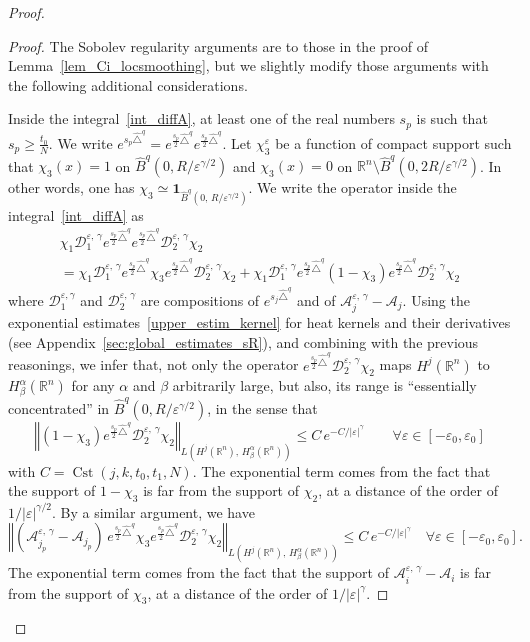 \documentclass[10pt]{amsart}
\theoremstyle{definition}\newtheorem{defi}[theo]{Definition}\newtheorem{rema}[theo]{Remark}\newtheorem{exam}[theo]{Example}\newtheorem{exem}[theo]{Example}\newtheorem{nota}[theo]{Notation}
\newcommand*\R{\mathbb{R}}
\newcommand{\calA}{\mathcal{A}}
\newcommand{\calD}{\mathcal{D}}
\newcommand{\bfun}{\mathbf{1}}
\DeclareMathOperator{\Cst}{Cst}
\renewcommand{\geq}{\geqslant}
\renewcommand{\leq}{\leqslant}
\let\oldforall\forall
\renewcommand*{\forall}{\mathrel{\oldforall}}
\begin{document}
\begin{proof}
\begin{proof}
The Sobolev regularity arguments are to those in the proof of Lemma~\ref{lem_Ci_locsmoothing}, but we slightly modify those arguments with the following additional considerations.

Inside the integral~\eqref{int_diffA}, at least one of the real numbers $s_p$ is such that $s_p\geq \frac{t_0}{N}$. We write $e^{s_p \widehat{\triangle}^{q}}=e^{\frac{s_p}{2} \widehat{\triangle}^{q}} e^{\frac{s_p}{2} \widehat{\triangle}^{q}}$. Let $\chi_3^\varepsilon$ be a function of compact support such that $\chi_3(x)=1$ on $\widehat{B}^q(0,R/\varepsilon^{\gamma/2})$ and $\chi_3(x)=0$ on $\R^n\setminus\widehat{B}^q(0,2R/\varepsilon^{\gamma/2})$. In other words, one has $\chi_3\simeq\bfun_{\widehat{B}^q(0,\,R/\varepsilon^{\gamma/2})}$. We write the operator inside the integral~\eqref{int_diffA} as
\begin{multline*}
\chi_1\calD_1^{\varepsilon,\,\gamma} e^{\frac{s_p}{2} \widehat{\triangle}^{q}} e^{\frac{s_p}{2} \widehat{\triangle}^{q}} \calD_2^{\varepsilon,\,\gamma} \chi_2\\
=
\chi_1\calD_1^{\varepsilon,\,\gamma} e^{\frac{s_p}{2} \widehat{\triangle}^{q}} \chi_3 e^{\frac{s_p}{2} \widehat{\triangle}^{q}} \calD_2^{\varepsilon,\,\gamma} \chi_2 
+
\chi_1\calD_1^{\varepsilon,\,\gamma} e^{\frac{s_p}{2} \widehat{\triangle}^{q}} (1-\chi_3) e^{\frac{s_p}{2} \widehat{\triangle}^{q}} \calD_2^{\varepsilon,\,\gamma} \chi_2
\end{multline*}
where $\calD_1^{\varepsilon,\gamma}$ and $\calD_2^{\varepsilon,\,\gamma}$ are compositions of $e^{s_j \widehat{\triangle}^{q}}$ and of $\calA_{j}^{\varepsilon,\,\gamma} - \calA_{j}$. Using the exponential estimates~\eqref{upper_estim_kernel} for heat kernels and their derivatives (see Appendix~\ref{sec:global_estimates_sR}), and combining with the previous reasonings, we infer that, not only the operator $e^{\frac{s_p}{2} \widehat{\triangle}^{q}} \calD_2^{\varepsilon,\,\gamma} \chi_2$ maps $H^j(\R^n)$ to $H^\alpha_\beta(\R^n)$ for any $\alpha$ and $\beta$ arbitrarily large, but also, its range is ``essentially concentrated'' in $\widehat{B}^q(0,R/\varepsilon^{\gamma/2})$, in the sense that
\[
\left\Vert (1-\chi_3) e^{\frac{s_p}{2} \widehat{\triangle}^{q}} \calD_2^{\varepsilon,\,\gamma} \chi_2 \right\Vert_{L\left(H^j(\R^n),\, H^\alpha_\beta(\R^n)\right)} \leq C \, e^{-C/\vert\varepsilon\vert^\gamma} \qquad\forall\varepsilon\in[-\varepsilon_0,\varepsilon_0]
\]
with $C=\Cst(j,k,t_0,t_1,N)$. The exponential term comes from the fact that the support of $1-\chi_3$ is far from the support of $\chi_2$, at a distance of the order of $1/\vert\varepsilon\vert^{\gamma/2}$. By a similar argument, we have
\[
\left\Vert \left(\calA_{j_p}^{\varepsilon,\,\gamma} - \calA_{j_p}\right) \, e^{\frac{s_p}{2} \widehat{\triangle}^{q}} \chi_3 e^{\frac{s_p}{2} \widehat{\triangle}^{q}} \calD_2^{\varepsilon,\,\gamma} \chi_2\right\Vert_{L\left(H^j(\R^n),\, H^\alpha_\beta(\R^n)\right)} \leq C \, e^{-C/\vert\varepsilon\vert^\gamma} \quad\forall\varepsilon\in[-\varepsilon_0,\varepsilon_0].
\]
The exponential term comes from the fact that the support of $\calA_i^{\varepsilon,\,\gamma} - \calA_i$ is far from the support of $\chi_3$, at a distance of the order of $1/\vert\varepsilon\vert^\gamma$.


\end{proof}
\end{proof}
\end{document}
